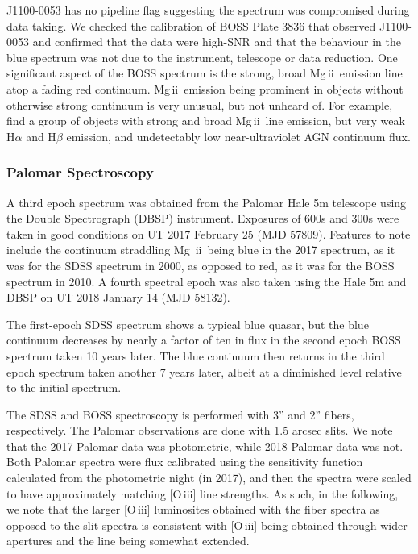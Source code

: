 \documentclass[a4paper,fleqn,usenatbib]{mnras}
\begin{document}
J1100-0053 has no pipeline flag suggesting the spectrum was
compromised during data taking. We checked the calibration of BOSS
Plate 3836 that observed J1100-0053 and confirmed that the data were
high-SNR and that the behaviour in the blue spectrum was not due to
the instrument, telescope or data reduction.  One significant aspect
of the BOSS spectrum is the strong, broad Mg\,{\sc ii}\ emission line
atop a fading red continuum.  Mg\,{\sc ii}\ emission being prominent
in objects without otherwise strong continuum is very unusual, but not
unheard of.  For example, \citet{Roig2014} find a group of objects
with strong and broad Mg\,{\sc ii}\ line emission, but very weak
H$\alpha$ and H$\beta$ emission, and undetectably low near-ultraviolet
AGN continuum flux.


\subsubsection{Palomar Spectroscopy} 
A third epoch spectrum was obtained from the Palomar Hale 5m telescope
using the Double Spectrograph (DBSP) instrument.  Exposures of 600s
and 300s were taken in good conditions on UT 2017 February 25 (MJD
57809). Features to note include the continuum straddling Mg\,{\sc
ii}\ being blue in the 2017 spectrum, as it was for the SDSS spectrum
in 2000, as opposed to red, as it was for the BOSS spectrum in 2010. A
fourth spectral epoch was also taken using the Hale 5m and DBSP on
UT 2018 January 14 (MJD 58132). 

The first-epoch SDSS spectrum shows a typical blue quasar, but the
blue continuum decreases by nearly a factor of ten in flux in the
second epoch BOSS spectrum taken 10 years later. The blue continuum
then returns in the third epoch spectrum taken another 7 years later,
albeit at a diminished level relative to the initial spectrum.

The SDSS and BOSS spectroscopy is performed with 3'' and 2'' fibers,
respectively. The Palomar observations are done with 1.5 arcsec
slits. We note that the 2017 Palomar data was photometric, while 2018
Palomar data was not.  Both Palomar spectra were flux calibrated using
the sensitivity function calculated from the photometric night (in
2017), and then the spectra were scaled to have approximately matching
[O\,{\sc iii}] line strengths. As such, in the following, we note that
the larger [O\,{\sc iii}] luminosites obtained with the fiber spectra
as opposed to the slit spectra is consistent with [O\,{\sc iii}] being
obtained through wider apertures and the line being somewhat extended.
\end{document}
